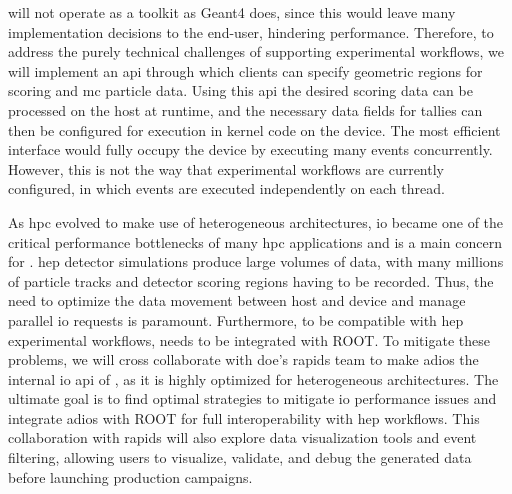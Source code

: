 \celeritas will not operate as a toolkit as Geant4 does, since this would leave
many implementation decisions to the end-user, hindering performance. Therefore,
to address the purely technical challenges of supporting experimental workflows,
we will implement an \ac{api} through which clients can specify geometric
regions for scoring and \ac{mc} particle data. Using this \ac{api} the desired
scoring data can be processed on the host at runtime, and the necessary data
fields for tallies can then be configured for execution in kernel code on the
device.  The most efficient interface would fully occupy the device by executing
many events concurrently.  However, this is not the way that experimental
workflows are currently configured, in which events are executed independently
on each thread.

As \ac{hpc} evolved to make use of heterogeneous architectures, \ac{io} became
one of the critical performance bottlenecks of many \ac{hpc} applications and is
a main concern for \celeritas. \ac{hep} detector simulations produce large
volumes of data, with many millions of particle tracks and detector scoring
regions having to be recorded. Thus, the need to optimize the data movement
between host and device and manage parallel \ac{io} requests is paramount.
Furthermore, to be compatible with \ac{hep} experimental workflows, \celeritas
needs to be integrated with ROOT. To mitigate these problems, we will cross
collaborate with \ac{doe}'s \ac{rapids} team to make \ac{adios} the internal
\ac{io} \ac{api} of \celeritas, as it is highly optimized for heterogeneous
architectures. The ultimate goal is to find optimal strategies to mitigate
\ac{io} performance issues and integrate \ac{adios} with ROOT for full
interoperability with \ac{hep} workflows. This collaboration with \ac{rapids}
will also explore data visualization tools and event filtering, allowing users
to visualize, validate, and debug the generated data before launching production
campaigns.
